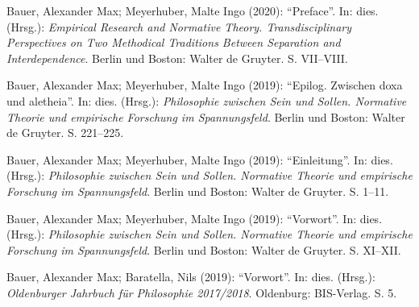 \documentclass[a4paper,10pt]{article}
\newenvironment{literature}{%
   \parskip6pt\parindent0pt\raggedright
   \def\lititem{\hangindent=1cm\hangafter1}}{%
   \par\ignorespaces}
\begin{document}
\begin{literature}
\lititem Bauer, Alexander Max; Meyerhuber, Malte Ingo (2020): \enquote{Preface}. In: dies. (Hrsg.): \textit{Empirical Research and Normative Theory. Transdisciplinary Perspectives on Two Methodical Traditions Between Separation and Interdependence}. Berlin und Boston: Walter de Gruyter. S. VII--VIII.

\lititem Bauer, Alexander Max; Meyerhuber, Malte Ingo (2019): \enquote{Epilog. Zwischen doxa und aletheia}. In: dies. (Hrsg.): \textit{Philosophie zwischen Sein und Sollen. Normative Theorie und empirische Forschung im Spannungsfeld}. Berlin und Boston: Walter de Gruyter. S. 221--225.

\lititem Bauer, Alexander Max; Meyerhuber, Malte Ingo (2019): \enquote{Einleitung}. In: dies. (Hrsg.): \textit{Philosophie zwischen Sein und Sollen. Normative Theorie und empirische Forschung im Spannungsfeld}. Berlin und Boston: Walter de Gruyter. S. 1--11.

\lititem Bauer, Alexander Max; Meyerhuber, Malte Ingo (2019): \enquote{Vorwort}. In: dies. (Hrsg.): \textit{Philosophie zwischen Sein und Sollen. Normative Theorie und empirische Forschung im Spannungsfeld}. Berlin und Boston: Walter de Gruyter. S. XI--XII.

\lititem Bauer, Alexander Max; Baratella, Nils (2019): \enquote{Vorwort}. In: dies. (Hrsg.): \textit{Oldenburger Jahrbuch für Philosophie 2017/2018}. Oldenburg: BIS-Verlag. S. 5.
\end{literature}
\end{document}
